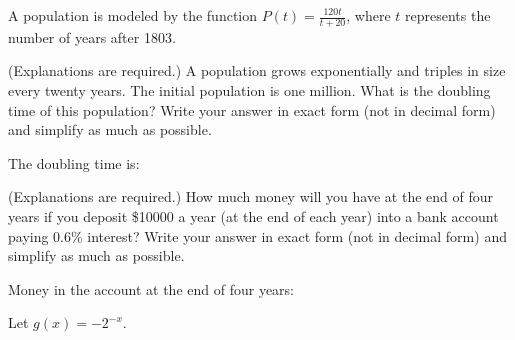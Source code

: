 \documentclass[11pt,answers]{exam}
\begin{document}
\begin{questions}
\begin{minipage}[b]{0.5\linewidth}
\begin{parts}
\end{parts}
\end{minipage}


\question A population is modeled by the function 
$\displaystyle P(t) = 
\frac{120t}{t + 20}$, where  $t$ represents the number of years after 1803. 
\newpage
\question[2] (Explanations are required.) A population grows exponentially and triples in size every twenty years. The initial population is one million. What is the doubling time of this population? Write your answer in exact form (not in decimal form) and simplify as much as possible.
\fillwithdottedlines{0.7in}

The doubling time is:\dotfill

\question[2] (Explanations are required.) How much money will you have at the end of four years if you deposit \$10000 a year (at the end of each year) into a bank account paying 0.6\% interest? Write your answer in exact form (not in decimal form) and simplify as much as possible.
\fillwithdottedlines{0.7in}

Money in the account at the end of four years:\dotfill

\question Let $\displaystyle g(x)=-2^{-x}$.
\begin{parts}



\end{parts}
\end{questions}
\end{document}
